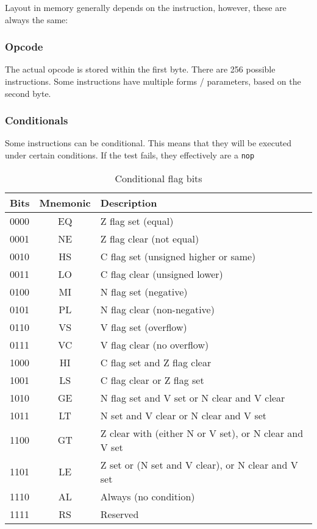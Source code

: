\documentclass[10pt,a4paper]{article}
\def\tcode#1{\texttt{#1}}
\begin{document}
			Layout in memory generally depends on the instruction, however, these are always the same:
			\subsubsection{Opcode}
			The actual opcode is stored within the first byte. There are 256 possible instructions. Some instructions have multiple forms / parameters, based on the second byte.
			\subsubsection{Conditionals}
			Some instructions can be conditional. This means that they will be executed under certain conditions. If the test fails, they effectively are a \tcode{nop}
			\begin{table}[h]
				\centering
				\begin{tabular}[h]{|l|c|l|}
					\hline
					Bits & Mnemonic & Description \\
					\hline
					0000 & EQ & Z flag set (equal) \\ 
					0001 & NE & Z flag clear (not equal)  \\ 
					0010 & HS & C flag set (unsigned higher or same)  \\ 
					0011 & LO & C flag clear (unsigned lower)  \\
					0100 & MI & N flag set (negative)   \\ 
					0101 & PL & N flag clear (non-negative)  \\
					0110 & VS & V flag set (overflow)  \\ 
					0111 & VC & V flag clear (no overflow)  \\ 
					1000 & HI & C flag set and Z flag clear  \\ 
					1001 & LS & C flag clear or Z flag set  \\
					1010 & GE & N flag set and V set or N clear and V clear  \\ 
					1011 & LT & N set and V clear or N clear and V set  \\ 
					1100 & GT & Z clear with (either N or V set), or N clear and V set \\
					1101 & LE & Z set or (N set and V clear), or N clear and V set  \\ 
					1110 & AL & Always (no condition)  \\
					1111 & RS & Reserved \\ 
					\hline
				\end{tabular}
			\caption{Conditional flag bits}
			\end{table}
			
\end{document}

